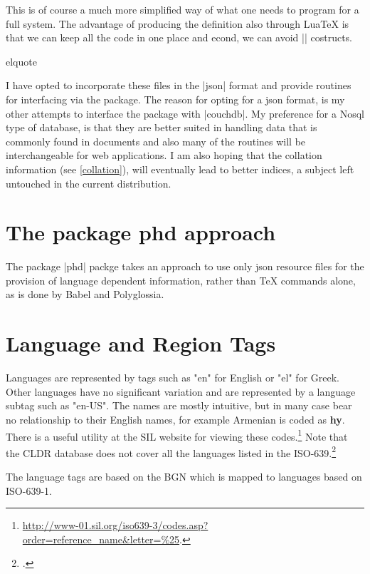 This is of course a much more simplified way of what one needs to program for a full system. The advantage
of producing the \tex definition also through LuaTeX is that we can keep all the code in one place and econd, we can avoid |\csname| costructs.
\begin{texexample}{elquote}{}
\end{texexample}

I have opted to incorporate these files in the |json| format and provide routines for interfacing via the  package.  The reason for opting for a json format, is my other attempts to interface the package with |couchdb|.  My preference for a Nosql type of database, is that  they are better suited in handling data that is commonly  found in documents and also many of the routines will be interchangeable for web applications. I am also hoping that the collation information (see \ref{collation}), will eventually lead to better indices, a subject left untouched in the current distribution.

\section{The package phd approach}

The package |phd| packge takes an approach to use only json resource files for the provision of language dependent information, rather than TeX commands alone, as is done by Babel and Polyglossia. 

\section{Language and Region Tags}

Languages are represented by tags such as "en"  for English or "el" for Greek. Other languages have no significant variation and are represented by a language subtag such as "en-US".  The names are mostly intuitive, but in many case bear no relationship to their English names, for example Armenian is coded as \textbf{hy}. There is a useful utility at the SIL website for viewing these codes.\footnote{\protect\url{http://www-01.sil.org/iso639-3/codes.asp?order=reference_name&letter=\%25}.} Note that the CLDR database does not cover all the languages listed in the ISO-639.\footcite{iso639} 

The language tags are based on the BGN which is mapped to languages based on ISO-639-1.

